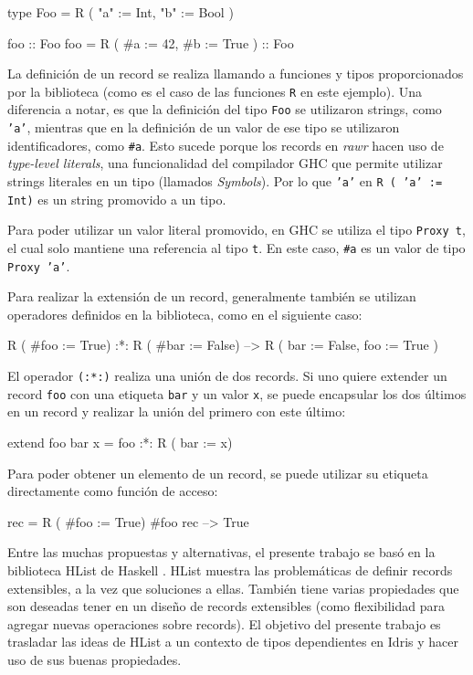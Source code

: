 \begin{code}
type Foo = R ( "a" := Int, "b" := Bool )

foo :: Foo
foo = R ( #a := 42, #b := True ) :: Foo
\end{code}

La definición de un record se realiza llamando a funciones y tipos proporcionados por la biblioteca (como es el caso de las funciones \texttt{R} en este ejemplo). Una diferencia a notar, es que la definición del tipo \texttt{Foo} se utilizaron strings, como \texttt{'a'}, mientras que en la definición de un valor de ese tipo se utilizaron identificadores, como \texttt{\#a}. Esto sucede porque los records en \textit{rawr} hacen uso de \textit{type-level literals}, una funcionalidad del compilador GHC que permite utilizar strings literales en un tipo (llamados \textit{Symbols}). Por lo que \texttt{'a'} en \texttt{R ( 'a' := Int)} es un string promovido a un tipo. 

Para poder utilizar un valor literal promovido, en GHC se utiliza el tipo \texttt{Proxy t}, el cual solo mantiene una referencia al tipo \texttt{t}. En este caso, \texttt{\#a} es un valor de tipo \texttt{Proxy 'a'}.

Para realizar la extensión de un record, generalmente también se utilizan operadores definidos en la biblioteca, como en el siguiente caso:

\begin{code}
R ( #foo := True) :*: R ( #bar := False)
--> R ( bar := False, foo := True )
\end{code}

El operador \texttt{(:*:)} realiza una unión de dos records. Si uno quiere extender un record \texttt{foo} con una etiqueta \texttt{bar} y un valor \texttt{x}, se puede encapsular los dos últimos en un record y realizar la unión del primero con este último:

\begin{code}
extend foo bar x = foo :*: R ( bar := x)
\end{code}

Para poder obtener un elemento de un record, se puede utilizar su etiqueta directamente como función de acceso:

\begin{code}
rec = R ( #foo := True)
#foo rec
--> True
\end{code}

Entre las muchas propuestas y alternativas, el presente trabajo se basó en la biblioteca HList de Haskell \cite{HListHackage}. HList muestra las problemáticas de definir records extensibles, a la vez que soluciones a ellas. También tiene varias propiedades que son deseadas tener en un diseño de records extensibles (como flexibilidad para agregar nuevas operaciones sobre records). El objetivo del presente trabajo es trasladar las ideas de HList a un contexto de tipos dependientes en Idris y hacer uso de sus buenas propiedades.

